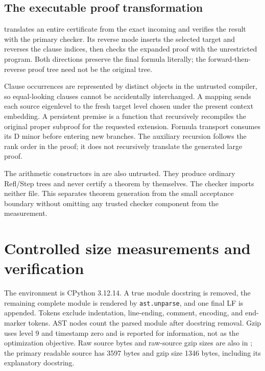 \documentclass[11pt,letterpaper]{article}
\theoremstyle{definition}
\begin{document}
\subsection{The executable proof transformation}

 translates an entire certificate from the exact
incoming  and verifies the result with
the primary checker. Its reverse mode inserts the selected target and
reverses the clause indices, then checks the expanded proof with the
unrestricted program. Both directions preserve the final formula
literally; the forward-then-reverse proof tree need not be the original
tree.

Clause occurrences are represented by distinct objects in the untrusted
compiler, so equal-looking clauses cannot be accidentally interchanged.
A mapping sends each source eigenlevel to the fresh target level chosen
under the present context embedding. A persistent premise is a function
that recursively recompiles the original proper subproof for the requested
extension. Formula transport consumes its D minor before entering new
branches. The auxiliary recursion follows the rank order in the proof;
it does not recursively translate the generated large proof.

The arithmetic constructors in  are also untrusted.
They produce ordinary Refl/Step trees and never certify a theorem by
themselves. The checker imports neither file. This separates theorem
generation from the small acceptance boundary without omitting any
trusted checker component from the measurement.

\section{Controlled size measurements and verification}
\label{sec:measurements}

The environment is CPython 3.12.14. A true module docstring is removed,
the remaining complete module is rendered by \texttt{ast.unparse},
and one final LF is appended. Tokens exclude indentation, line-ending,
comment, encoding, and end-marker tokens. AST nodes count the parsed
module after docstring removal. Gzip uses level 9 and timestamp zero
and is reported for information, not as the optimization objective.
Raw source bytes and raw-source gzip sizes are also in
; the primary readable source has 3597 bytes
and gzip size 1346 bytes, including its explanatory docstring.
\end{document}
